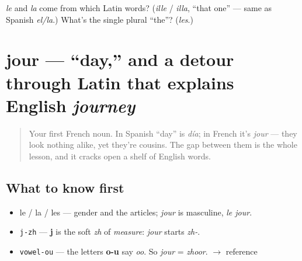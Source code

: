 \begin{tcolorbox}[breakable,colback=teal!4,colframe=teal!35!black,title={Before you move on}]
\emph{le} and \emph{la} come from which Latin words? (\emph{ille} / \emph{illa}, \textquotedblleft{}that one\textquotedblright{} — same as Spanish \emph{el/la}.) What's the single plural \textquotedblleft{}the\textquotedblright{}? (\emph{les}.)
\end{tcolorbox}
\section[jour]{jour — \textquotedblleft{}day,\textquotedblright{} and a detour through Latin that explains English \emph{journey}}

\label{lesson:FR-C01-jour}



\begin{quote}
Your first French noun. In Spanish \textquotedblleft{}day\textquotedblright{} is \emph{día}; in French it's \emph{jour} — they look nothing alike, yet they're cousins. The gap between them is the whole lesson, and it cracks open a shelf of English words.
\end{quote}

\subsection*{What to know first}
\begin{itemize}
\raggedright
  \item le / la / les — gender and the articles; \emph{jour} is masculine, \emph{le jour}.
\end{itemize}

\begin{sounds}
\begin{itemize}
\raggedright
  \item \texttt{j-zh} — \textbf{j} is the soft \emph{zh} of \emph{measure}: \emph{jour} starts \emph{zh-}.
  \item \texttt{vowel-ou} — the letters \textbf{o-u} say \emph{oo}. So \emph{jour} = \emph{zhoor}. $\to$ reference
\end{itemize}
\end{sounds}

